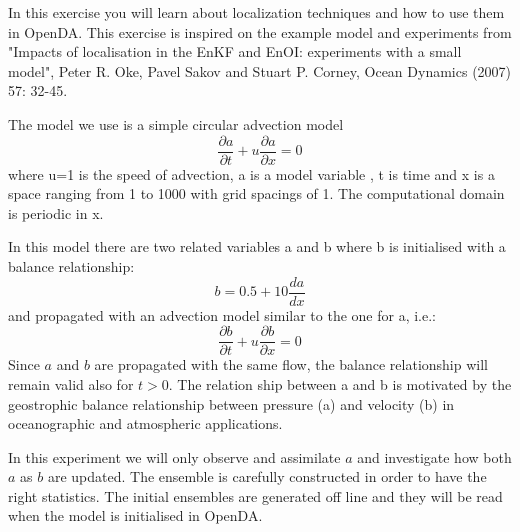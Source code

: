 In this exercise you will learn about localization techniques and how to use them in OpenDA. This exercise is inspired on the example model and experiments from "Impacts of localisation in the EnKF and EnOI: experiments with a small model", Peter R. Oke, Pavel Sakov and Stuart P. Corney, Ocean Dynamics (2007) 57: 32-45.

The model we use is a simple circular advection model 
\begin{equation}
\frac{\partial a}{\partial t}+u\frac{\partial a}{\partial x}=0
\end{equation}
where u=1 is the speed of advection, a is a model variable , t is time and x is a space ranging from 1 to 1000 with grid spacings of 1. The computational domain is periodic in x.

In this model there are two related variables a and b where b is initialised with a balance relationship:
\begin{equation}\label{eg:b_relation}
b= 0.5 + 10 \frac{da}{dx}
\end{equation}
and propagated with an advection model similar to the one for a, i.e.:
\begin{equation}
\frac{\partial b}{\partial t}+u\frac{\partial b}{\partial x}=0
\end{equation}
Since $a$ and $b$ are propagated with the same flow, the balance relationship will remain valid also for $t>0$.
The relation ship between a and b is motivated by the geostrophic balance relationship between pressure (a) and velocity (b) in oceanographic and atmospheric applications. 

In this experiment we will only observe and assimilate $a$ and investigate how both $a$ as $b$ are updated. 
The ensemble is carefully constructed in order to have the right statistics. The initial ensembles are generated off line and they will be read when the model is initialised in OpenDA. 

